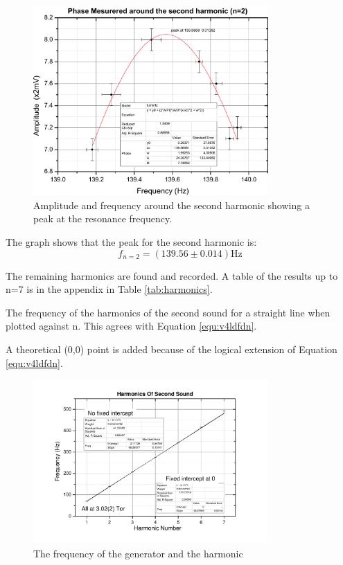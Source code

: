 \begin{figure}[htb]
\centering
\includegraphics[width=0.8\textwidth]{pics/secondharmonic2.pdf}
\caption{Amplitude and frequency around the second harmonic showing a peak at the resonance frequency. \label{fig:secondharmonic2}}
\end{figure}


The graph shows that the peak for the second harmonic is:
\begin{equation}
\boxed{f_{n=2} = (139.56 \pm 0.014)\text{Hz}}
\end{equation}

The remaining harmonics are found and recorded.
A table of the results up to n=7 is in the appendix in Table \ref{tab:harmonics}.

The frequency of the harmonics of the second sound for a straight line when 
plotted against n. This agrees with Equation \ref{equ:v4ldfdn}.

A theoretical (0,0) point is added because of the logical extension of Equation \ref{equ:v4ldfdn}.


\begin{figure}[htb]
\centering
\includegraphics[width=0.8\textwidth]{pics/harmonicsofsecondsound.pdf}
\caption{The frequency of the generator and the harmonic\label{fig:harmonicsofsecondsound}}
\end{figure}

